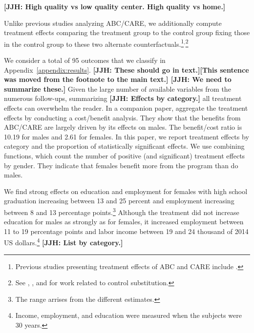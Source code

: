 \textbf{[JJH: High quality vs low quality center. High quality vs home.]}

Unlike previous studies analyzing ABC/CARE, we additionally compute treatment effects comparing the treatment group to the control group fixing those in the control group to these two alternate counterfactuals.\footnote{Previous studies presenting treatment effects of ABC and CARE include \citet{Ramey_etal_1985_Project-CARE_TiECSE, Clarke_Campbell_1998_ABC_Comparison_ECRQ,Campbell_Pungello_etal_2001_DP,Campbell_Ramey_etal_2002_ADS,Campbell_Wasik_etal_2008_ECRQ,Campbell_Conti_etal_2014_EarlyChildhoodInvestments}.}$^,$\footnote{See \cite{Heckman_1992_randomization}, \cite{Heckman_Hohmann_etal_2000_QJE}, and \cite{Kline_Walters_2016_QJE} for work related to control substitution.}

We consider a total of 95 outcomes that we classify in Appendix~\ref{appendix:results}. \textbf{[JJH: These should go in text.][This sentence was moved from the footnote to the main text.] [JJH: We need to summarize these.]} Given the large number of available variables from the numerous follow-ups, summarizing \textbf{[JJH: Effects by category.]} all treatment effects can overwhelm the reader. In a companion paper, \citet{Garcia_Heckman_Leaf_etal_2017_Comp_CBA_Unpublished} aggregate the treatment effects by conducting a cost/benefit analysis. They show that the benefits from ABC/CARE are largely driven by its effects on males. The benefit/cost ratio is 10.19 for males and 2.61 for females. In this paper, we report treatment effects by category and the proportion of statistically significant effects. We use combining functions, which count the number of positive (and significant) treatment effects by gender. They indicate that females benefit more from the program than do males.

We find strong effects on education and employment for females with high school graduation increasing between 13 and 25 percent and employment increasing between 8 and 13 percentage points.\footnote{The range arrises from the different estimates.} Although the treatment did not increase education for males as strongly as for females, it increased employment between 11 to 19 percentage points and labor income between 19 and 24 thousand of 2014 US dollars.\footnote{Income, employment, and education were measured when the subjects were 30 years.} \textbf{[JJH: List by category.]}

